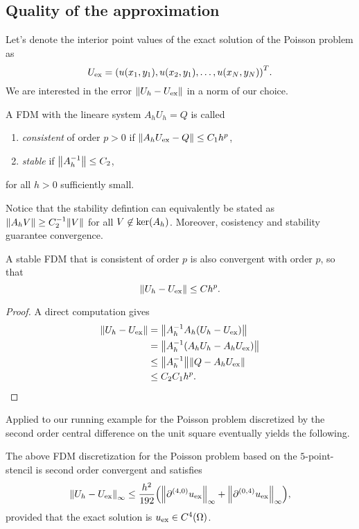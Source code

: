 \subsection{Quality of the approximation}


Let's denote the interior point values of the exact solution of the Poisson problem as
\[
	U_{\text{ex}} = \parentheses*{u\parentheses*{x_1, y_1}, u\parentheses*{x_2, y_1}, \ldots, u\parentheses*{x_N, y_N}}^T.
\]
We are interested in the error \(\norm*{U_h - U_{\text{ex}}}\) in a norm of our choice.

\begin{definition}
	A FDM with the lineare system \(A_h U_h = Q\) is called
	\begin{enumerate}
		\item \emph{consistent} of order \(p > 0\) if \(\norm*{A_h U_{\text{ex}} - Q} \le C_1 h^p\),
		\item \emph{stable} if \(\norm*{A_h^{-1}} \le C_2\),
	\end{enumerate}
	for all \(h > 0\) sufficiently small.
\end{definition}

Notice that the stability defintion can equivalently be stated as \(\norm*{A_h V} \ge C_2^{-1}\norm*{V}\) for all \(V \not\in \ker\parentheses*{A_h}\).
Moreover, cosistency and stability guarantee convergence.

\begin{theorem}
	A stable FDM that is consistent of order \(p\) is also convergent with order \(p\), so that
	\[
		\norm*{U_h - U_{\text{ex}}} \le Ch^p.
	\]
\end{theorem}

\begin{proof}
	A direct computation gives
	\begin{align*}
		\norm*{U_h - U_{\text{ex}}} &= \norm*{A_h^{-1}A_h\parentheses*{U_h - U_{\text{ex}}}}\\
		&= \norm*{A_h^{-1}\parentheses*{A_h U_h - A_h U_{\text{ex}}}}\\
		&\le \norm*{A_h^{-1}}\norm*{Q - A_h U_{\text{ex}}}\\
		&\le C_2 C_1 h^p.
	\end{align*}
\end{proof}

Applied to our running example for the Poisson problem discretized by the second order central difference on the unit square eventually yields the following.

\begin{theorem}
	The above FDM discretization for the Poisson problem based on the \(5\)-point-stencil is second order convergent and satisfies
	\[
		\norm*{U_h - U_{\text{ex}}}_\infty \le \frac{h^2}{192}\parentheses*{\norm*{\partial^{\parentheses*{4, 0}}u_{\text{ex}}}_\infty + \norm*{\partial^{\parentheses*{0, 4}}u_{\text{ex}}}_\infty},
	\]
	provided that the exact solution is \(u_{\text{ex}} \in C^4\parentheses*{\Omega}\).
\end{theorem}

